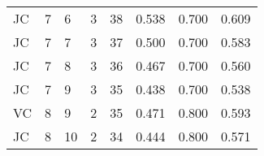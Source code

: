 \documentclass[fontsize=12pt, usenames, dvipsnames, headinclude, headsepline, footinclude, footsepline]{scrartcl}
\begin{document}
\begin{landscape}
\begin{table}[]
{\begin{tabular}{@{}llllllll@{}}
    JC                & 7             & 6              & 3              & 38            & 0.538             & 0.700  & 0.609 \\
    JC                & 7             & 7              & 3              & 37            & 0.500             & 0.700  & 0.583 \\
    JC                & 7             & 8              & 3              & 36            & 0.467             & 0.700  & 0.560 \\
    JC                & 7             & 9              & 3              & 35            & 0.438             & 0.700  & 0.538 \\
    VC                & 8             & 9              & 2              & 35            & 0.471             & 0.800  & 0.593 \\
    JC                & 8             & 10             & 2              & 34            & 0.444             & 0.800  & 0.571 \\ \bottomrule
  \end{tabular}}
\end{table}
\end{landscape}




	
\end{document}
